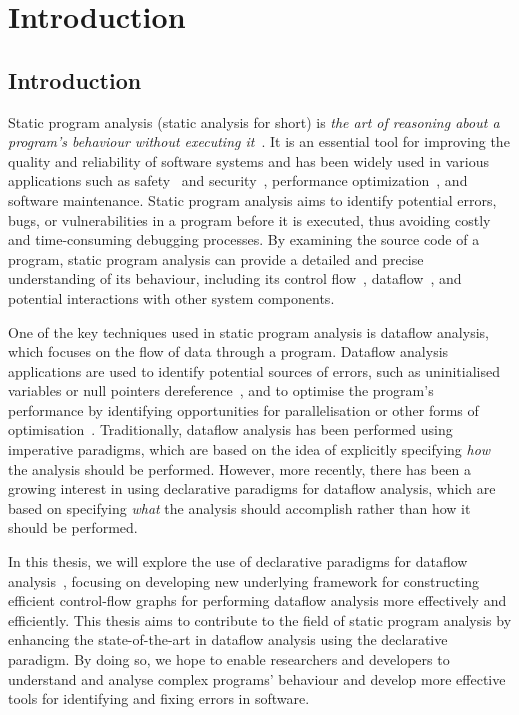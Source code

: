 \chapter{Introduction}
\section{Introduction}

Static program analysis (static analysis for short) is 
\emph{the art of reasoning about a program's behaviour without executing it}~\cite{spa}.
It is an essential tool for improving the quality and reliability of software
systems and has been widely used in various applications such
as safety~\cite{cousot2005astree,Blanchet2002} and security~\cite{piskachev2021secucheck,flowDroid,ayewah2008using,dura2021javadl,fink2012wala},
performance optimization~\cite{aho2007compilers,appel2004modern}, and software maintenance.
Static program analysis aims to identify potential errors, bugs, or vulnerabilities
in a program before it is executed, thus avoiding costly and time-consuming 
debugging processes. By examining the source code of a program, static program 
analysis can provide a detailed and precise understanding of its behaviour, including
its control flow~\cite{allen1970control}, dataflow~\cite{kam1977monotone}, and potential interactions with other system components.



One of the key techniques used in static program analysis is dataflow analysis,
which focuses on the flow of data through a program. Dataflow analysis applications are used to identify
potential sources of errors, such as uninitialised variables or null pointers dereference~\cite{riouak2021precise,10.1016/j.scico.2012.02.002}, 
and to optimise the program's performance by identifying opportunities for 
parallelisation or other forms of optimisation~\cite{aho2007compilers}.
Traditionally, dataflow analysis has been performed using imperative paradigms, 
which are based on the idea of explicitly specifying \emph{how} the analysis should be 
performed. 
However, more recently, there has been a growing interest in using 
declarative paradigms for dataflow analysis, which are based on specifying \emph{what}
the analysis should accomplish rather than how it should be performed.

In this thesis, we will explore the use of declarative paradigms for dataflow 
analysis~\cite{smits2020flowspec,madsen2016programming}, focusing on developing new underlying framework for constructing 
efficient control-flow graphs for performing dataflow 
analysis more effectively and efficiently.
This thesis aims to contribute to the field of static program analysis 
by enhancing the state-of-the-art in dataflow analysis using the declarative paradigm. 
By doing so, we hope to enable researchers and developers to understand and 
analyse complex programs' behaviour and develop more effective tools for 
identifying and fixing errors in software.



